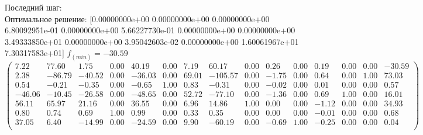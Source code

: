 \documentclass[draft]{article}
\begin{document}
\begin{flushleft}
    Последний шаг: \\
    Оптимальное решение:
    [0.00000000e+00  0.00000000e+00  0.00000000e+00  6.80092951e-01
    0.00000000e+00  5.66227730e-01 0.00000000e+00 0.00000000e+00
    3.49333850e+01  0.00000000e+00 3.95042603e-02 0.00000000e+00
    1.60061967e+01  7.30317583e+01]
    $f_(min) = -30.59$
\begin{equation*}
\begin{pmatrix}
   7.22 &  77.60 &   1.75 & 0.00 &  40.19 & 0.00 &  7.19 &   60.17 & 0.00 &  0.26 & 0.00 &  0.19 & 0.00 & 0.00 & -30.59 \\
   2.38 & -86.79 & -40.52 & 0.00 & -36.03 & 0.00 & 69.01 & -105.57 & 0.00 & -1.75 & 0.00 &  0.64 & 0.00 & 1.00 &  73.03 \\
   0.54 &  -0.21 &  -0.35 & 0.00 &  -0.65 & 1.00 &  0.83 &   -0.31 & 0.00 & -0.02 & 0.00 &  0.01 & 0.00 & 0.00 &   0.57 \\
 -46.06 & -10.45 & -26.58 & 0.00 & -48.65 & 0.00 & 52.72 &  -77.10 & 0.00 & -1.36 & 0.00 &  0.69 & 1.00 & 0.00 &  16.01 \\
  56.11 &  65.97 &  21.16 & 0.00 &  36.55 & 0.00 &  6.96 &   14.86 & 1.00 &  0.00 & 0.00 & -1.12 & 0.00 & 0.00 &  34.93 \\
   0.80 &   0.74 &   0.69 & 1.00 &   0.99 & 0.00 &  0.33 &    0.35 & 0.00 &  0.00 & 0.00 & -0.01 & 0.00 & 0.00 &   0.68 \\
  37.05 &   6.40 & -14.99 & 0.00 & -24.59 & 0.00 &  9.90 &  -60.19 & 0.00 & -0.69 & 1.00 & -0.25 & 0.00 & 0.00 &   0.04 \\
\end{pmatrix}
\end{equation*}
\end{flushleft}
\end{document}

